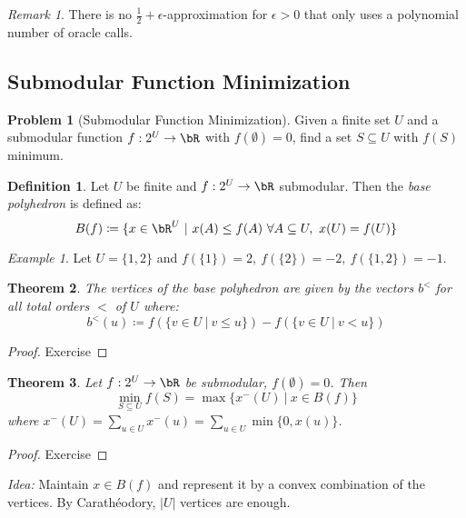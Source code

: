 \documentclass[11pt, a4paper]{article}
\newcommand{\abs}[1]{\left\lvert#1\right\rvert}
\newcommand{\set}[1]{\{#1\}}
\newtheorem{theorem}{Theorem}[section]
\theoremstyle{remark}
\newtheorem*{uremark}{Remark}
\newtheorem*{example}{Example}
\theoremstyle{definition}
\newtheorem{definition}[theorem]{Definition}
\newtheorem*{problem}{Problem}
\begin{document}
\begin{uremark}
	There is no $\frac{1}{2}+\epsilon$-approximation for $\epsilon>0$ that
	only uses a polynomial number of oracle calls.
\end{uremark}


\subsection{Submodular Function Minimization}

\begin{problem}[Submodular Function Minimization]
Given a finite set $U$ and a submodular function $f: 2^U\to\bR$ with
$f(\emptyset)=0$, find a set $S\subseteq U$ with $f(S)$ minimum.
\end{problem}

\setcounter{theorem}{52}
\begin{definition}
	Let $U$ be finite and $f: 2^U\to\bR$ submodular. Then the \emph{base
		polyhedron} is defined as:
	\[B(f)\coloneqq\set{x\in\bR^U\ |\ x(A)\leq f(A)\ \forall A\subseteq U,
		\ x(U)=f(U)}\]
\end{definition}

\begin{example}
	Let $U=\set{1,2}$ and $f(\set{1})=2,\ f(\set{2})=-2,\ f(\set{1,2})=-1$.
\end{example}

\begin{theorem}
	The vertices of the base polyhedron are given by the vectors $b^<$
	for all total orders $<$ of $U$ where:
	\[b^<(u)\coloneqq f(\set{v\in U\ |\ v\leq u})-f(\set{v\in U\ |\ v<u})\]
\end{theorem}
\begin{proof}
	Exercise
\end{proof}

\begin{theorem}\label{thm:submodular-min}
	Let $f: 2^U\to\bR$ be submodular, $f(\emptyset)=0$. Then
	\[\min_{S\subseteq U}f(S)=\max\set{x^-(U)\ |\ x\in B(f)}\]
	where $x^-(U)=\sum_{u\in U}x^-(u)=\sum_{u\in U}\min\set{0,x(u)}$.
\end{theorem}
\begin{proof}
	Exercise
\end{proof}

\emph{Idea:} Maintain $x\in B(f)$ and represent it by a convex combination
of the vertices. By Carathéodory, $\abs{U}$ vertices are enough.
\end{document}
